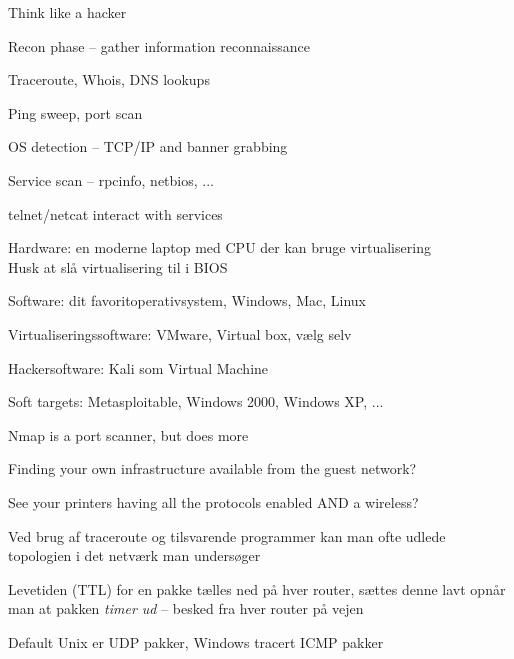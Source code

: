 \documentclass[Screen16to9,17pt]{foils}
\begin{document}

\begin{list1}
\item Think like a hacker
\item Recon phase -- gather information reconnaissance
\begin{list2}
\item Traceroute, Whois, DNS lookups
\item Ping sweep, port scan
\item OS detection -- TCP/IP and banner grabbing
\item Service scan -- rpcinfo, netbios, ...
\item telnet/netcat interact with services
\end{list2}
\end{list1}





\begin{list2}
\item Hardware: en moderne laptop med CPU der kan bruge virtualisering\\
Husk at slå virtualisering til i BIOS
\item Software: dit favoritoperativsystem, Windows, Mac, Linux
\item Virtualiseringssoftware: VMware, Virtual box, vælg selv
\item Hackersoftware: Kali som Virtual Machine 
\item Soft targets: Metasploitable, Windows 2000, Windows XP, ...
\end{list2}



\begin{list2}
\item Nmap is a port scanner, but does more
\item Finding your own infrastructure available from the guest network?
\item See your printers having all the protocols enabled AND a wireless?
\end{list2}



\begin{list1}
\item Ved brug af traceroute og tilsvarende programmer kan man ofte
  udlede topologien i det netværk man undersøger
\item Levetiden (TTL) for en pakke tælles ned på hver router, sættes denne lavt
  opnår man at pakken \emph{timer ud} -- besked fra hver router på vejen
\item Default Unix er UDP pakker, Windows tracert ICMP pakker
\end{list1}
\end{document}
